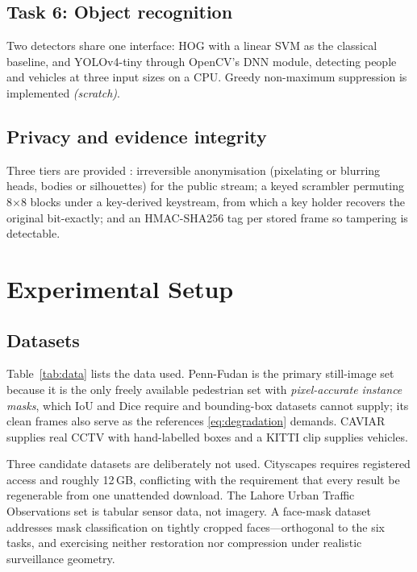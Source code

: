 \documentclass[conference,10pt]{IEEEtran}
\begin{document}
\subsection{Task 6: Object recognition}
Two detectors share one interface: HOG with a linear SVM \cite{dalal2005} as
the classical baseline, and YOLOv4-tiny \cite{bochkovskiy2020} through
OpenCV's DNN module, detecting people and vehicles at three input sizes on a
CPU. Greedy non-maximum suppression is implemented \emph{(scratch)}.

\subsection{Privacy and evidence integrity}
Three tiers are provided \cite{ribaric2016privacy}: irreversible anonymisation
(pixelating or blurring heads, bodies or silhouettes) for the public stream; a
keyed scrambler permuting 8$\times$8 blocks under a key-derived keystream, from
which a key holder recovers the original bit-exactly; and an HMAC-SHA256 tag
\cite{nist2008hmac} per stored frame so tampering is detectable.

\section{Experimental Setup}\label{sec:setup}

\subsection{Datasets}
Table~\ref{tab:data} lists the data used. Penn-Fudan \cite{wang2007pennfudan} is the primary still-image set because it
is the only freely available pedestrian set with \emph{pixel-accurate instance
masks}, which IoU and Dice require and bounding-box datasets cannot supply; its
clean frames also serve as the references \eqref{eq:degradation} demands.
CAVIAR \cite{caviar2004} supplies real CCTV with hand-labelled boxes and a
KITTI \cite{geiger2012kitti} clip supplies vehicles.

Three candidate datasets are deliberately not used. Cityscapes
\cite{cordts2016cityscapes} requires registered access and roughly 12\,GB,
conflicting with the requirement that every result be regenerable from one
unattended download. The Lahore Urban Traffic Observations set is tabular
sensor data, not imagery. A face-mask dataset addresses mask classification on
tightly cropped faces---orthogonal to the six tasks, and exercising neither
restoration nor compression under realistic surveillance geometry.
\end{document}
